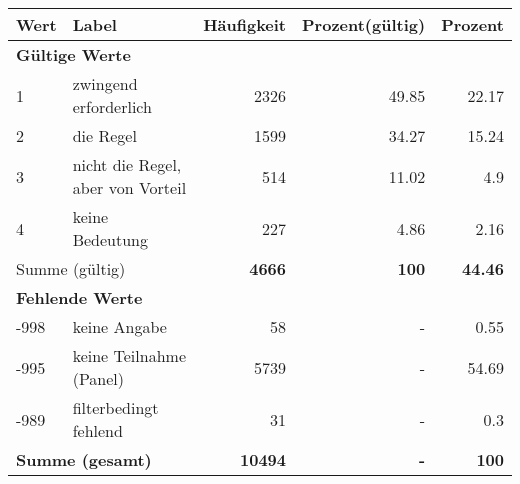      \begin{longtable}{lXrrr}
     \toprule
     \textbf{Wert} & \textbf{Label} & \textbf{Häufigkeit} & \textbf{Prozent(gültig)} & \textbf{Prozent} \\
     \endhead
     \midrule
     \multicolumn{5}{l}{\textbf{Gültige Werte}}\\

     1 &
     \multicolumn{1}{X}{ zwingend erforderlich   } &


       \num{2326} &
       \num[round-mode=places,round-precision=2]{49,85} &
         \num[round-mode=places,round-precision=2]{22,17} \\

     2 &
     \multicolumn{1}{X}{ die Regel   } &


       \num{1599} &
       \num[round-mode=places,round-precision=2]{34,27} &
         \num[round-mode=places,round-precision=2]{15,24} \\

     3 &
     \multicolumn{1}{X}{ nicht die Regel, aber von Vorteil   } &


       \num{514} &
       \num[round-mode=places,round-precision=2]{11,02} &
         \num[round-mode=places,round-precision=2]{4,9} \\

     4 &
     \multicolumn{1}{X}{ keine Bedeutung   } &


       \num{227} &
       \num[round-mode=places,round-precision=2]{4,86} &
         \num[round-mode=places,round-precision=2]{2,16} \\
     \midrule
     \multicolumn{2}{l}{Summe (gültig)} &
       \textbf{\num{4666}} &
     \textbf{100} &
       \textbf{\num[round-mode=places,round-precision=2]{44,46}} \\
     \multicolumn{5}{l}{\textbf{Fehlende Werte}}\\
       -998 &
       keine Angabe &
         \num{58} &
        - &
         \num[round-mode=places,round-precision=2]{0,55} \\
       -995 &
       keine Teilnahme (Panel) &
         \num{5739} &
        - &
         \num[round-mode=places,round-precision=2]{54,69} \\
       -989 &
       filterbedingt fehlend &
         \num{31} &
        - &
         \num[round-mode=places,round-precision=2]{0,3} \\
     \midrule
     \multicolumn{2}{l}{\textbf{Summe (gesamt)}} &
          \textbf{\num{10494}} &
        \textbf{-} &
        \textbf{100} \\
     \bottomrule
     \end{longtable}
     
